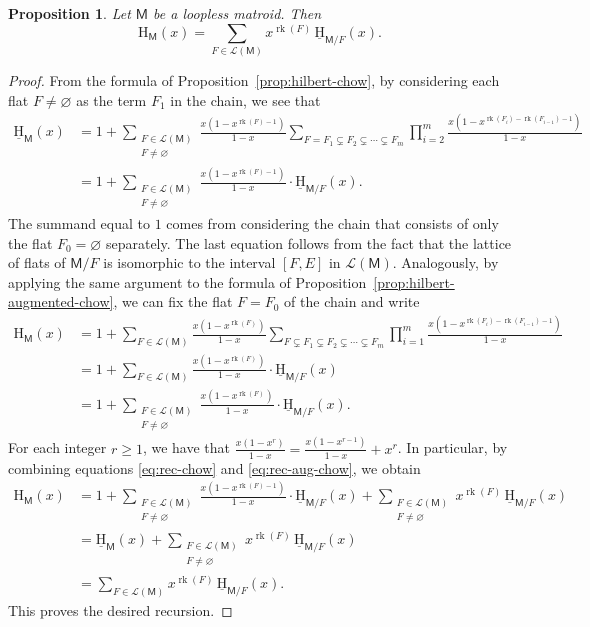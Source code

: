 \documentclass[11pt, a4paper, english]{amsart}
\theoremstyle{teoremas}
\newtheorem{proposition}[theorem]{Proposition}
\theoremstyle{definition}
\DeclareMathOperator{\rk}{rk}
\newcommand{\M}{\mathsf{M}}
\renewcommand{\H}{\mathrm{H}}
\newcommand{\uH}{\underline{\mathrm{H}}}
\begin{document}
\begin{proposition}\label{prop:recursion-H-in-terms-uH}
    Let $\M$ be a loopless matroid. Then
    \[ \H_{\M}(x) = \sum_{F\in \mathcal{L}(\M)} x^{\rk(F)}\, \uH_{\M/F}(x).\]
\end{proposition}

\begin{proof}
    From the formula of Proposition~\ref{prop:hilbert-chow}, by considering each flat $F\neq \varnothing$ as the term $F_1$ in the chain, we see that
    \begin{align}
        \uH_{\M}(x) &= 1 +  \sum_{\substack{F\in\mathcal{L}(\M)\\F\neq\varnothing}} \frac{x(1-x^{\rk(F)-1})}{1-x} \sum_{F=F_1\subsetneq F_2\subsetneq\cdots\subsetneq F_m} \prod_{i=2}^m \frac{x(1-x^{\rk(F_i)-\rk(F_{i-1})-1})}{1-x} \nonumber\\
        &=1 + \sum_{\substack{F\in\mathcal{L}(\M)\\F\neq\varnothing}} \frac{x(1-x^{\rk(F)-1})}{1-x}\cdot \uH_{\M/F}(x). \label{eq:rec-chow}
    \end{align}
    The summand equal to $1$ comes from considering the chain that consists of only the flat $F_0=\varnothing$ separately. The last equation follows from the fact that the lattice of flats of $\M/F$ is isomorphic to the interval $[F,E]$ in $\mathcal{L}(\M)$. Analogously, by applying the same argument to the formula of Proposition~\ref{prop:hilbert-augmented-chow}, we can fix the flat $F=F_0$ of the chain and write
    \begin{align}
        \H_{\M}(x) &= 1 + \sum_{F\in\mathcal{L}(\M)} \frac{x(1-x^{\rk(F)})}{1-x} \sum_{F\subsetneq F_1\subsetneq F_2\subsetneq\cdots\subsetneq F_m} \prod_{i=1}^m \frac{x(1-x^{\rk(F_i)-\rk(F_{i-1})-1})}{1-x} \nonumber\\
        &=1+\sum_{F\in\mathcal{L}(\M)} \frac{x(1-x^{\rk(F)})}{1-x}\cdot \uH_{\M/F}(x)\nonumber\\
        &= 1+\sum_{\substack{F\in\mathcal{L}(\M)\\F\neq\varnothing}} \frac{x(1-x^{\rk(F)})}{1-x}\cdot \uH_{\M/F}(x). \label{eq:rec-aug-chow}
    \end{align}
    For each integer $r\geq 1$, we have that $\frac{x(1-x^r)}{1-x} = \frac{x(1-x^{r-1})}{1-x} + x^r$. In particular, by combining equations \eqref{eq:rec-chow} and \eqref{eq:rec-aug-chow}, we obtain
    \begin{align*}
        \H_{\M}(x)
        &= 1 + \sum_{\substack{F\in\mathcal{L}(\M)\\F\neq\varnothing}} \frac{x(1-x^{\rk(F)-1})}{1-x}\cdot \uH_{\M/F}(x) + \sum_{\substack{F\in\mathcal{L}(\M)\\F\neq\varnothing}} x^{\rk(F)}\, \uH_{\M/F}(x) \\
        &= \uH_{\M}(x) +  \sum_{\substack{F\in\mathcal{L}(\M)\\F\neq\varnothing}} x^{\rk(F)}\, \uH_{\M/F}(x) \\
        &= \sum_{F\in \mathcal{L}(\M)} x^{\rk(F)}\, \uH_{\M/F}(x).
    \end{align*}
    This proves the desired recursion. 
\end{proof}
\end{document}
